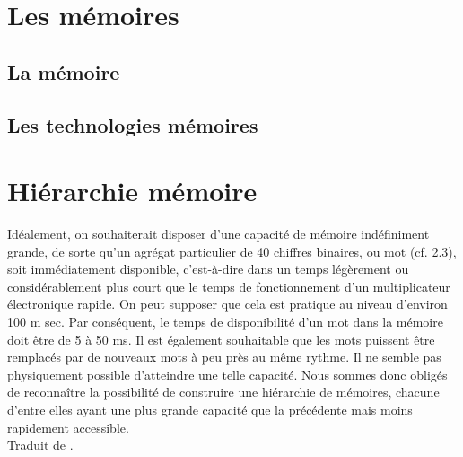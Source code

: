 \section{Les mémoires}



\subsection{La mémoire}









\subsection{Les technologies mémoires}
















\section{Hiérarchie mémoire}

\begin{fancyquotes}
Idéalement, on souhaiterait disposer d'une capacité de mémoire indéfiniment grande, de sorte qu'un agrégat particulier de 40 chiffres binaires, ou mot (cf. 2.3), soit immédiatement disponible, c'est-à-dire dans un temps légèrement ou considérablement plus court que le temps de fonctionnement d'un multiplicateur électronique rapide. On peut supposer que cela est pratique au niveau d'environ 100 m sec. Par conséquent, le temps de disponibilité d'un mot dans la mémoire doit être de 5 à 50 ms. Il est également souhaitable que les mots puissent être remplacés par de nouveaux mots à peu près au même rythme. Il ne semble pas physiquement possible d'atteindre une telle capacité. Nous sommes donc obligés de reconnaître la possibilité de construire une hiérarchie de mémoires, chacune d'entre elles ayant une plus grande capacité que la précédente mais moins rapidement accessible.\\
Traduit de \cite{burks1946preliminary}.

\end{fancyquotes}


